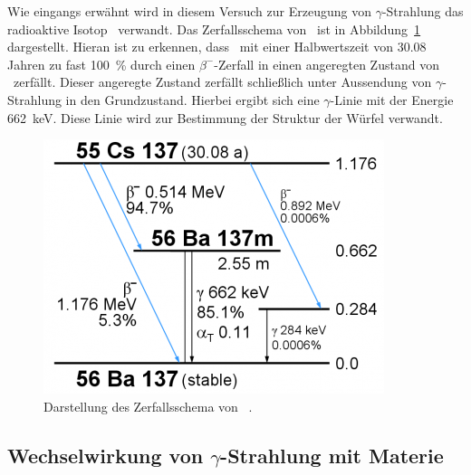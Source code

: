 Wie eingangs erwähnt wird in diesem Versuch zur Erzeugung von
$\gamma$-Strahlung das radioaktive Isotop \Cs~verwandt.
Das Zerfallsschema von \Cs~ist in Abbildung~\ref{fig:Cs}
dargestellt.
Hieran ist zu erkennen, dass \Cs~mit einer Halbwertszeit von 30.08 Jahren
zu fast \SI{100}{\percent} durch einen
$\beta^-$-Zerfall in einen angeregten Zustand von \Ba~zerfällt.
Dieser angeregte Zustand zerfällt schließlich unter Aussendung von
$\gamma$-Strahlung in den Grundzustand.
Hierbei ergibt sich eine $\gamma$-Linie mit der Energie \SI{662}{\keV}.
Diese Linie wird zur Bestimmung der Struktur der Würfel
verwandt.
\begin{figure}[t]
  \centering
  \includegraphics[scale=0.6]{bilder/376px-Cs137keV.png}
  \caption{Darstellung des Zerfallsschema von \Cs~.\cite{Cs137}}
\label{fig:Cs}
\end{figure}

\newpage
\subsection{Wechselwirkung von $\gamma$-Strahlung mit Materie}
\label{sub:wechselwirkung_von_gamma_strahlung_mit_materie}

